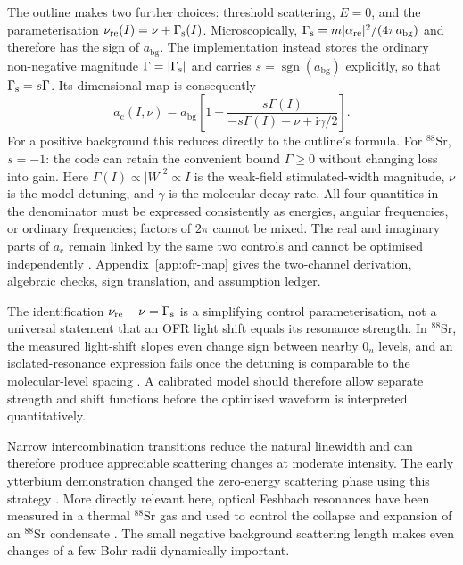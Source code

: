 \documentclass[9pt,a4paper,twocolumn,twoside]{rho-class/rho}
\newcommand{\ac}{a_{\mathrm{c}}}
\newcommand{\abg}{a_{\mathrm{bg}}}
\newcommand{\ii}{\mathrm{i}}
\begin{document}
        The outline makes two further choices: threshold scattering, $E=0$,
        and the parameterisation
        $\nu_{\rm re}(I)=\nu+\Gamma_{\rm s}(I)$.  Microscopically,
        $\Gamma_{\rm s}=m|\alpha_{\rm re}|^2/(4\pi\abg)$ and therefore has
        the sign of $\abg$.  The implementation instead stores the ordinary
        non-negative magnitude $\Gamma=|\Gamma_{\rm s}|$ and carries
        $s=\operatorname{sgn}(\abg)$ explicitly, so that
        $\Gamma_{\rm s}=s\Gamma$.  Its dimensional map is consequently
        \begin{equation}\label{eq:ofr-dimensional}
            \ac(I,\nu)=\abg\left[
                1+\frac{s\Gamma(I)}{-s\Gamma(I)-\nu+\ii\gamma/2}
            \right].
        \end{equation}
        For a positive background this reduces directly to the outline's
        formula. For $^{88}\mathrm{Sr}$, $s=-1$: the code can retain the
        convenient bound $\Gamma\geq0$ without changing loss into gain. Here
        $\Gamma(I)\propto|W|^2\propto I$ is the weak-field stimulated-width
        magnitude, $\nu$ is the model detuning, and $\gamma$ is the molecular
        decay rate.  All four quantities in the denominator must be expressed
        consistently as energies, angular frequencies, or ordinary
        frequencies; factors of $2\pi$ cannot be mixed.  The real and imaginary
        parts of $\ac$ remain linked by the same two controls and cannot be
        optimised independently \cite{bohn1997prospects}. Appendix~\ref{app:ofr-map}
        gives the two-channel derivation, algebraic checks, sign translation,
        and assumption ledger.

        The identification
        $\nu_{\rm re}-\nu=\Gamma_{\rm s}$ is a simplifying control
        parameterisation, not a universal statement that an OFR light shift
        equals its resonance strength.  In $^{88}\mathrm{Sr}$, the measured
        light-shift slopes even change sign between nearby $0_u$ levels, and an
        isolated-resonance expression fails once the detuning is comparable to
        the molecular-level spacing \cite{blatt2011measurement}.  A calibrated
        model should therefore allow separate strength and shift functions
        before the optimised waveform is interpreted quantitatively.

        Narrow intercombination transitions reduce the natural linewidth and can therefore produce appreciable scattering changes at moderate intensity. The early ytterbium demonstration changed the zero-energy scattering phase using this strategy \cite{enomoto2008optical}. More directly relevant here, optical Feshbach resonances have been measured in a thermal $^{88}\mathrm{Sr}$ gas and used to control the collapse and expansion of an $^{88}\mathrm{Sr}$ condensate \cite{blatt2011measurement,yan2013controlling}. The small negative background scattering length makes even changes of a few Bohr radii dynamically important.
\end{document}
